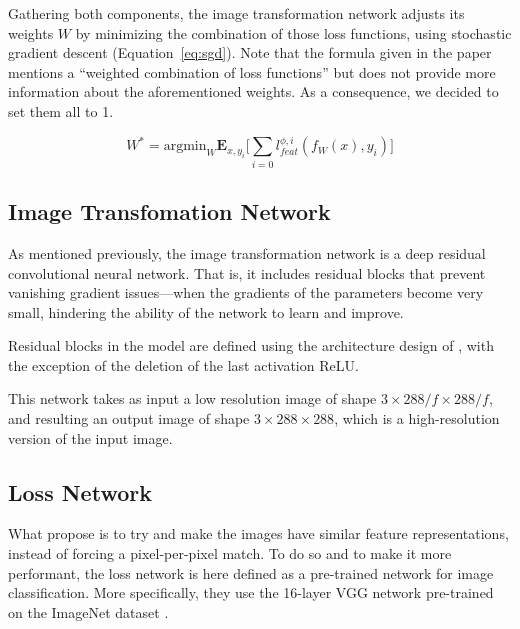 \documentclass{article}
\begin{document}
{    \bigskip

    Gathering both components, the image transformation network adjusts its weights $W$ by minimizing the combination of those loss functions, using stochastic gradient descent (Equation~\ref{eq:sgd}). Note that the formula given in the paper \citep{sr} mentions a “weighted combination of loss functions” but does not provide more information about the aforementioned weights. As a consequence, we decided to set them all to 1.

    \begin{equation}
        W^* = \text{argmin}_W \textbf{E}_{x,y_i} \biggl[ \sum_{i=0} l^{\phi, i}_{feat}(f_W(x), y_i) \biggr]
        \label{eq:sgd}
    \end{equation}

    \subsection{Image Transfomation Network}
    \label{subsec:image-transformation-network-method}

    As mentioned previously, the image transformation network is a deep residual convolutional neural network. That is, it includes residual blocks that prevent vanishing gradient issues---when the gradients of the parameters become very small, hindering the ability of the network to learn and improve.

    Residual blocks in the model are defined using the architecture design of \cite{rb}, with the exception of the deletion of the last activation ReLU. 
      
     This network takes as input a low resolution image of shape $3 \times 288/f \times 288/f$, and resulting an output image of shape $3 \times 288 \times 288$, which is a high-resolution version of the input image.

    \subsection{Loss Network}
    \label{subsec:loss-network-method}

    What propose \cite{sr} is to try and make the images have similar feature representations, instead of forcing a pixel-per-pixel match. To do so and to make it more performant, the loss network is here defined as a pre-trained network for image classification. More specifically, they use the 16-layer VGG network \citep{vgg} pre-trained on the ImageNet dataset \citep{image-net}.

}
\end{document}
